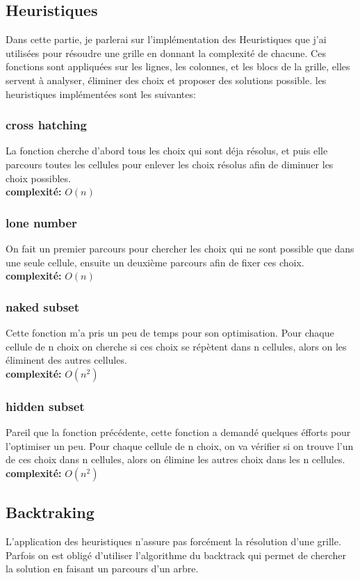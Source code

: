 \documentclass[12pt]{article}
\begin{document}
    \subsection{Heuristiques}
    Dans cette partie, je parlerai sur l'implémentation des Heuristiques que j'ai utilisées pour résoudre une grille en donnant la complexité de chacune. Ces fonctions sont appliquées sur les lignes, les colonnes, et les blocs de la grille, elles servent à analyser, éliminer des choix et proposer des solutions possible. les heuristiques implémentées sont les suivantes:
    \subsubsection{cross hatching}
    La fonction cherche d'abord tous les choix qui sont déja résolus, et puis elle parcours toutes les cellules pour enlever les choix résolus afin de diminuer les choix possibles.\\
    \textbf{complexité:} $O(n)$ 
	\subsubsection{lone number}
     On fait un premier parcours pour chercher les choix qui ne sont possible que dans une seule cellule, ensuite un deuxième parcours afin de fixer ces choix.\\
     \textbf{complexité:} $O(n)$
     \subsubsection{naked subset}
     Cette fonction m'a pris un peu de temps pour son optimisation. Pour chaque cellule de n choix on cherche si ces choix se répètent dans n cellules, alors on les éliminent des autres cellules.\\    
     \textbf{complexité:} $O(n^2)$
     \subsubsection{hidden subset}
     Pareil que la fonction précédente, cette fonction a demandé quelques éfforts pour l'optimiser un peu. Pour chaque cellule de n choix, on va vérifier si on trouve l'un de ces choix dans n cellules, alors on élimine les autres choix dans les n cellules.\\   
     \textbf{complexité:} $O(n^2)$
     \subsection{Backtraking}
     L'application des heuristiques n'assure pas forcément la résolution d'une grille. Parfois on est obligé d'utiliser l'algorithme du backtrack qui permet de chercher la solution en faisant un parcours d'un arbre.
\end{document}

